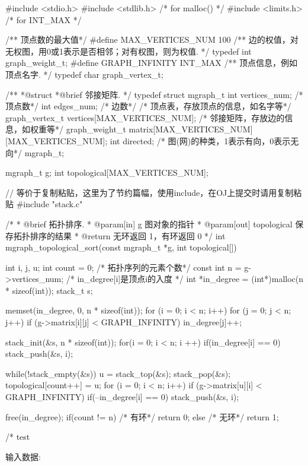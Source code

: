 \begin{Codex}[label=mgraph_topological_sort.c]
#include <stdio.h>
#include <stdlib.h>  /* for malloc() */
#include <limits.h>  /* for INT_MAX */

/** 顶点数的最大值*/
#define MAX_VERTICES_NUM 100
/** 边的权值，对无权图，用0或1表示是否相邻；对有权图，则为权值. */
typedef int graph_weight_t;
#define GRAPH_INFINITY INT_MAX
/** 顶点信息，例如顶点名字. */
typedef char graph_vertex_t;

/**
 *@struct
 *@brief 邻接矩阵.
 */
typedef struct mgraph_t {
    int vertices_num; /* 顶点数*/
    int edges_num; /* 边数*/
    /* 顶点表，存放顶点的信息，如名字等*/
    graph_vertex_t vertices[MAX_VERTICES_NUM];
    /* 邻接矩阵，存放边的信息，如权重等*/
    graph_weight_t matrix[MAX_VERTICES_NUM][MAX_VERTICES_NUM];
    int directed; /* 图(网)的种类，1表示有向，0表示无向*/
} mgraph_t;

mgraph_t g;
int topological[MAX_VERTICES_NUM];

// 等价于复制粘贴，这里为了节约篇幅，使用include，在OJ上提交时请用复制粘贴
#include "stack.c"

/*
  * @brief 拓扑排序.
  * @param[in] g 图对象的指针
  * @param[out] topological 保存拓扑排序的结果
  * @return 无环返回 1，有环返回 0
  */
int mgraph_topological_sort(const mgraph_t *g, int topological[]) {
    int i, j, u;
    int count = 0; /* 拓扑序列的元素个数*/
    const int n = g->vertices_num;
    /* in_degree[i]是顶点i的入度 */
    int *in_degree = (int*)malloc(n * sizeof(int));
    stack_t s;

    memset(in_degree, 0, n * sizeof(int));
    for (i = 0; i < n; i++) {
        for (j = 0; j < n; j++) {
            if (g->matrix[i][j] < GRAPH_INFINITY)
                in_degree[j]++;
        }
    }

    stack_init(&s, n * sizeof(int));
    for(i = 0; i < n; i ++) {
        if(in_degree[i] == 0)
            stack_push(&s, i);
    }

    while(!stack_empty(&s)) {
        u = stack_top(&s); stack_pop(&s);
        topological[count++] = u;
        for (i = 0; i < n; i++) if (g->matrix[u][i] < GRAPH_INFINITY) {
                if(--in_degree[i] == 0)
                    stack_push(&s, i);
        }
    }

    free(in_degree);
    if(count != n) { /* 有环*/
        return 0;
    } else { /* 无环*/
        return 1;
    }
}


/* test

输入数据:


\end{Codex}
